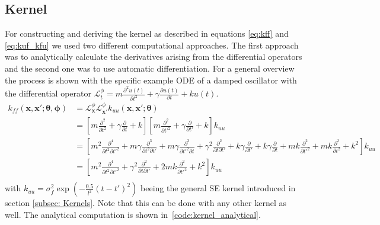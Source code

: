 \documentclass{article}
\begin{document}
\subsection{Kernel}
For constructing and deriving the kernel as described in equations \ref{eq:kff} and \ref{eq:kuf_kfu} we used two different computational approaches. The first approach was to analytically calculate the derivatives arising from the differential operators and the second one was to use automatic differentiation. For a general overview the process is shown with the specific example ODE of a damped oscillator with the differential operator $\mathcal{L}_{t}^\phi = m\frac{\partial^2 u(t)}{\partial t^2} + \gamma \frac{\partial u(t)}{\partial t} + k u(t) $.\\

\begin{equation}
\begin{aligned}
    k_{ff}(\bm{x},\bm{x'};\bm{\theta}, \bm{\phi}) &= \mathcal{L}_{\bm{x}}^\phi \mathcal{L}_{\bm{x'}}^\phi k_{uu}(\bm{x},\bm{x'};\bm{\theta})\\
    &= \left[ m\frac{\partial^2 }{\partial t^2} + \gamma \frac{\partial }{\partial t} + k \right] \left[ m\frac{\partial^2 }{\partial t'^2} + \gamma \frac{\partial }{\partial t'} + k \right] k_{uu} \\
    &= \left[m^2 \frac{\partial^4 }{\partial t^2 \partial t'^2} + m\gamma \frac{\partial^3 }{\partial t^2 \partial t'} + m\gamma \frac{\partial^3 }{\partial t'^2 \partial t} + \gamma^2 \frac{\partial^2 }{\partial t \partial t'} + k\gamma \frac{\partial }{\partial t'} + k\gamma \frac{\partial }{\partial t} +mk \frac{\partial^2 }{\partial t'^2} +mk \frac{\partial^2 }{\partial t^2} + k^2 \right] k_{uu}\\
    &= \left[m^2 \frac{\partial^4 }{\partial t^2 \partial t'^2}  + \gamma^2 \frac{\partial^2 }{\partial t \partial t'}  +2mk \frac{\partial^2 }{\partial t'^2} + k^2 \right] k_{uu}\\
\end{aligned}
\label{eq:kernel_analytical}
\end{equation}
 with $k_{uu} = \sigma_f^2  \exp\left({-\frac{0.5}{l^2} {(t-t')}^2}\right)$ beeing the general SE kernel introduced in section \ref{subsec: Kernels}. Note that this can be done with any other kernel as well. The analytical computation is shown in~\ref{code:kernel_analytical}.\\

\end{document}
